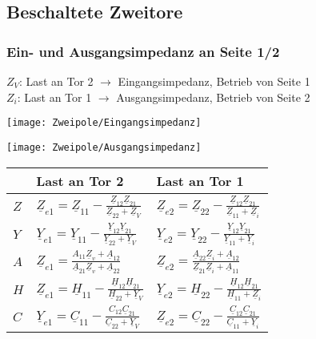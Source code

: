 \subsection{Beschaltete Zweitore}
\subsubsection{Ein- und Ausgangsimpedanz an Seite 1/2}
{\footnotesize $Z_V$: Last an Tor 2 $\rightarrow$ Eingangsimpedanz, Betrieb von Seite 1\\ $Z_i$: Last an Tor 1 $\rightarrow$ Ausgangsimpedanz, Betrieb von Seite 2}\\
\setlength{\parindent}{0pt}
\begin{minipage}{0.5\columnwidth}
\texttt{[image: Zweipole/Eingangsimpedanz]}
\end{minipage}
\begin{minipage}{0.5\columnwidth}
	\texttt{[image: Zweipole/Ausgangsimpedanz]}
\end{minipage}
	\renewcommand{\arraystretch}{1.8}
\begin{tabularx}{\columnwidth}{|X|l|l|}

	\hline  & Last an Tor 2 & Last an Tor 1 \\
	\hline$Z$ & $ \underline{Z}_{e1} =  \underline{Z}_{11}-\frac{\underline{Z}_{12} \underline{Z}_{21}}{\underline{Z}_{22}+\underline{Z}_{V}}$ & $\underline{Z}_{e 2}=\underline{Z}_{22}-\frac{\underline{Z}_{12} \underline{Z}_{21}}{\underline{Z}_{11}+\underline{Z}_{i}}$ \\
	\hline
	$Y$ & $\underline{Y}_{e 1}=\underline{Y}_{11}-\frac{\underline{Y}_{12} \underline{Y}_{21}}{\underline{Y}_{22}+\underline{Y}_{V}}$ & $\underline{Y}_{e 2}=\underline{Y}_{22}-\frac{\underline{Y}_{12} \underline{Y}_{21}}{\underline{Y}_{11}+\underline{Y}_{i}}$ \\
	\hline
	$A$ & $\underline{Z}_{e 1}=\frac{A_{11} \underline{Z}_{v}+\underline{A}_{12}}{\underline{A}_{21} \underline{Z}_{v}+\underline{A}_{22}}$ & $\underline{Z}_{e 2}=\frac{\underline{A}_{22} \underline{Z}_{i}+\underline{A}_{12}}{\underline{Z}_{21} \underline{Z}_{i}+\underline{A}_{11}}$ \\
	\hline
	$H$ & $\underline{Z}_{e 1}=\underline{H}_{11}-\frac{\underline{H}_{12} \underline{H}_{21}}{\underline{H}_{22}+\underline{Y}_{V}}$ & $\underline{Y}_{e 2}=\underline{H}_{22}-\frac{\underline{H}_{12} \underline{H}_{21}}{\underline{H}_{11}+\underline{Z}_{i}}$ \\
	\hline
	$C$ & $\underline{Y}_{e1}=\underline{C}_{11}-\frac{C_{12} \underline{C}_{21}}{\underline{C}_{22}+\underline{Y}_{V}}$ & $\underline{Z}_{e 2}=\underline{C}_{22}-\frac{\underline{C}_{12} \underline{C}_{21}}{\underline{C}_{11}+\underline{Y}_{i}}$ \\
	\hline
\end{tabularx}

